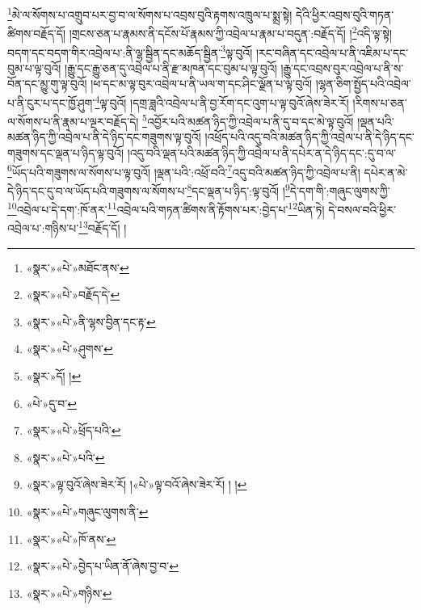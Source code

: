 \footnote{«སྣར་»«པེ་»མཐོང་ནས་}མེ་ལ་སོགས་པ་འགྲུབ་པར་བྱ་བ་ལ་སོགས་པ་འབྲས་བུའི་རྟགས་འཁྲུལ་པ་སྨྲ་སྟེ། དེའི་ཕྱིར་འབྲས་བུའི་གཏན་ཚིགས་བརྗོད་དོ། །གྲངས་ཅན་པ་རྣམས་ནི་དངོས་པོ་རྣམས་ཀྱི་འབྲེལ་པ་རྣམ་པ་བདུན་:བརྗོད་དོ། །\footnote{«སྣར་»«པེ་»བརྗོད་དེ་}འདི་ལྟ་སྟེ། བདག་དང་བདག་གིར་འབྲེལ་པ་:ནི་ལྷ་སྦྱིན་དང་མཆོད་སྦྱིན་\footnote{«སྣར་»«པེ་»ནི་ལྷས་བྱིན་དང་རྟ་}ལྟ་བུའོ། །རང་བཞིན་དང་འབྲེལ་པ་ནི་འཇིམ་པ་དང་བུམ་པ་ལྟ་བུའོ། །རྒྱུ་དང་རྒྱུ་ཅན་དུ་འབྲེལ་པ་ནི་རྫ་མཁན་དང་བུམ་པ་ལྟ་བུའོ། །རྒྱུ་དང་འབྲས་བུར་འབྲེལ་པ་ནི་ས་བོན་དང་མྱུ་གུ་ལྟ་བུའོ། །ཕ་དང་མ་ལྟ་བུར་འབྲེལ་པ་ནི་ཡལ་ག་དང་ཤིང་ལྗོན་པ་ལྟ་བུའོ། །ལྷན་ཅིག་སྤྱོད་པའི་འབྲེལ་པ་ནི་ངུར་པ་དང་ཁྱོ་ཤུག་\footnote{«སྣར་»«པེ་»ཤུགས་}ལྟ་བུའོ། །དགྲ་ཟླའི་འབྲེལ་པ་ནི་བྱ་རོག་དང་འུག་པ་ལྟ་བུའོ་ཞེས་ཟེར་རོ། །རིགས་པ་ཅན་ལ་སོགས་པ་ནི་རྣམ་པ་ལྔར་བརྗོད་དེ། \footnote{«སྣར་»དོ། ། }འབྱོར་པའི་མཚན་ཉིད་ཀྱི་འབྲེལ་པ་ནི་དུ་བ་དང་མེ་ལྟ་བུའོ། །ལྡན་པའི་མཚན་ཉིད་ཀྱི་འབྲེལ་པ་ནི་དེ་ཉིད་དང་གཟུགས་ལྟ་བུའོ། །འཕྲོད་པའི་འདུ་བའི་མཚན་ཉིད་ཀྱི་འབྲེལ་པ་ནི་དེ་ཉིད་དང་གཟུགས་དང་ལྡན་པ་ཉིད་ལྟ་བུའོ། །འདུ་བའི་ལྡན་པའི་མཚན་ཉིད་ཀྱི་འབྲེལ་པ་ནི་དཔེར་ན་དེ་ཉིད་དང་:དུ་བ་ལ་\footnote{«པེ་»དུ་བ་}ཡོད་པའི་གཟུགས་ལ་སོགས་པ་ལྟ་བུའོ། །ལྡན་པའི་:འཕྲོ་བའི་\footnote{«སྣར་»«པེ་»ཕྲོད་པའི་}འདུ་བའི་མཚན་ཉིད་ཀྱི་འབྲེལ་པ་ནི། དཔེར་ན་མེ་དེ་ཉིད་དང་དུ་བ་ལ་ཡོད་པའི་གཟུགས་ལ་སོགས་པ་\footnote{«སྣར་»«པེ་»པའི་}དང་ལྡན་པ་ཉིད་:ལྟ་བུའོ། །\footnote{«སྣར་»ལྟ་བུའོ་ཞེས་ཟེར་རོ། །«པེ་»ལྟ་བའོ་ཞེས་ཟེར་རོ། ། །}དེ་དག་གི་:གཞུང་ལུགས་ཀྱི་\footnote{«སྣར་»«པེ་»གཞུང་ལུགས་ནི་}འབྲེལ་པ་དེ་དག་:ཁོ་ནར་\footnote{«སྣར་»«པེ་»ཁོ་ནས་}འབྲེལ་པའི་གཏན་ཚིགས་ནི་རྟོགས་པར་:བྱེད་པ་\footnote{«སྣར་»«པེ་»བྱེད་པ་ཡིན་ནོ་ཞེས་བྱ་བ་}ཡིན་ཏེ། དེ་བསལ་བའི་ཕྱིར་འབྲེལ་པ་:གཉིས་པ་\footnote{«སྣར་»«པེ་»གཉིས་}བརྗོད་དོ། །
